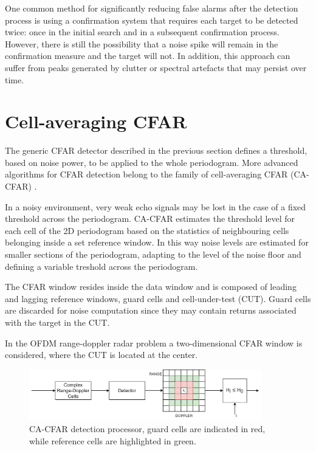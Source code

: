 One common method for significantly reducing false alarms after the detection process is using a confirmation system that requires each target to be detected twice: once in the initial search and in a subsequent confirmation process.
However, there is still the possibility that a noise spike will remain in the confirmation measure and the target will not. In addition, this approach can suffer from peaks generated by clutter or spectral artefacts that may persist over time.

\section{Cell-averaging CFAR}
\label{sec:cell averaging CFAR}

The generic CFAR detector described in the previous section defines a threshold, based on noise power, to be applied to the whole periodogram. More advanced algorithms for CFAR detection belong to the family of cell-averaging CFAR (CA-CFAR) \cite{Richards_2014}.

In a noisy environment, very weak echo signals may be lost in the case of a fixed threshold across the periodogram. CA-CFAR estimates the threshold level for each cell of the 2D periodogram based on the statistics of neighbouring cells belonging inside a set reference window. In this way noise levels are estimated for smaller sections of the periodogram, adapting to the level of the noise floor and defining a variable treshold across the periodogram.

The CFAR window resides inside the data window and is composed of leading and lagging reference windows, guard cells and cell-under-test (CUT). Guard cells are discarded for noise computation since they may contain returns associated with the target in the CUT.

In the OFDM range-doppler radar problem a two-dimensional CFAR window is considered, where the CUT is located at the center.

\begin{figure}[H]
	\centering
	\includegraphics[width=0.9\textwidth]{Images/radar_detect_threshold/cacfar_pipeline.png}
	\caption{CA-CFAR detection processor, guard cells are indicated in red, while reference cells are highlighted in green.}
	\label{fig:cacfar_pipeline}
\end{figure}



